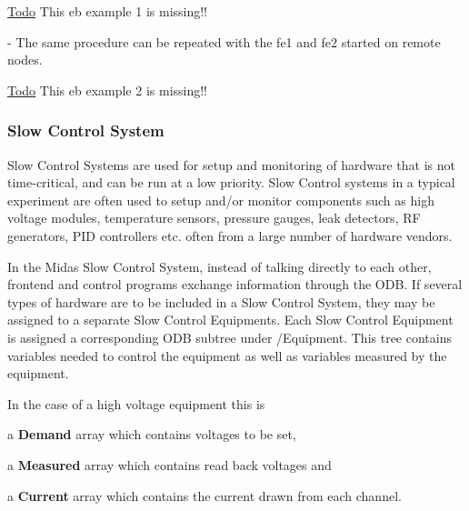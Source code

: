 \begin{Desc}
\item[\hyperlink{todo__todo000003}{Todo}]This eb example 1 is missing!!\end{Desc}
-\/ The same procedure can be repeated with the fe1 and fe2 started on remote nodes.

\begin{Desc}
\item[\hyperlink{todo__todo000004}{Todo}]This eb example 2 is missing!!\end{Desc}
\par
 

\par
 \label{index_end}
\hypertarget{index_end}{}
 \subsubsection{Slow Control System}\label{FE_Slow_Control_system}
\label{FE_Slow_Control_system_idx_slow-control_system}
\hypertarget{FE_Slow_Control_system_idx_slow-control_system}{}
 \par
 

\par


Slow Control Systems are used for setup and monitoring of hardware that is not time-\/critical, and can be run at a low priority. Slow Control systems in a typical experiment are often used to setup and/or monitor components such as high voltage modules, temperature sensors, pressure gauges, leak detectors, RF generators, PID controllers etc. often from a large number of hardware vendors.

In the Midas Slow Control System, instead of talking directly to each other, frontend and control programs exchange information through the ODB. If several types of hardware are to be included in a Slow Control System, they may be assigned to a separate Slow Control Equipments. Each Slow Control Equipment is assigned a corresponding ODB subtree under /Equipment. This tree contains variables needed to control the equipment as well as variables measured by the equipment.

In the case of a high voltage equipment this is
\begin{DoxyItemize}
\item a {\bfseries Demand} array which contains voltages to be set,
\item a {\bfseries Measured} array which contains read back voltages and
\item a {\bfseries Current} array which contains the current drawn from each channel.
\end{DoxyItemize}

